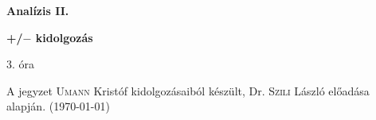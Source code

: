 \documentclass[a4paper,11.5pt]{article}
\begin{document}
	\setlength\parindent{0pt}
	\def\s{\hspace{0.2mm}\vphantom{\beta}}
	\def\Z{\mathbb{Z}}
	\def\Q{\mathbb{Q}}
	\def\R{\mathbb{R}}
	\def\C{\mathbb{C}}
	\def\N{\mathbb{N}}
	\def\Ra{\overline{\mathbb{R}}}
	
	\def\sume{\displaystyle\sum_{n=1}^{+\infty}}
	\def\sumn{\displaystyle\sum_{n=0}^{+\infty}}
	
	\def\narrow{\underset{n\rightarrow+\infty}{\longrightarrow}}
	\def\limn{\displaystyle\lim_{n\to +\infty}}
	\def\limx{\displaystyle\lim_{x\to +\infty}}
	
	\theoremstyle{definition}
	\newtheorem{theorem}{Tétel}[subsection] 
	
	\theoremstyle{definition}
	\newtheorem{definition}[theorem]{Definíció} 
	\newtheorem{example}[theorem]{Példa} 
	\newtheorem{task}[theorem]{Feladat} 
	\newtheorem{note}[theorem]{Megjegyzés}
	\begin{center}
		{\LARGE \textbf{Analízis II.}}
		
		{\large \textbf{+/$-$ kidolgozás}}
		
		3. óra
	\end{center}
	A jegyzet \textsc{Umann} Kristóf kidolgozásaiból készült, Dr. \textsc{Szili} László előadása alapján. (\today)
	
\end{document}
